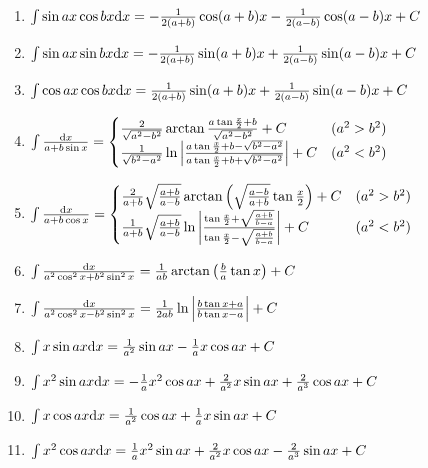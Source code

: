 \begin{enumerate}
	\item $ \int \sin ax \cos bx \mathrm{d} x = -\frac{1}{2(a+b)}\cos(a+b)x - \frac{1}{2(a-b)}\cos(a-b)x + C $

	\item $ \int \sin ax \sin bx \mathrm{d} x = -\frac{1}{2(a+b)}\sin(a+b)x + \frac{1}{2(a-b)}\sin(a-b)x + C $

	\item $ \int \cos ax \cos bx \mathrm{d} x =  \frac{1}{2(a+b)}\sin(a+b)x + \frac{1}{2(a-b)}\sin(a-b)x + C $

	\item $ \int \frac{\mathrm{d} x}{a + b \sin x} = \begin{cases}
	\frac{2}{\sqrt{a^2-b^2}}\arctan\frac{a\tan\frac{x}{2}+b}{\sqrt{a^2-b^2}} + C & (a^2 > b^2) \\
	\frac{1}{\sqrt{b^2-a^2}}\ln \left| \frac{a\tan\frac{x}{2}+b-\sqrt{b^2-a^2}}{a\tan\frac{x}{2}+b+\sqrt{b^2-a^2}} \right| + C & (a^2 < b^2)
	\end{cases} $

	\item $ \int \frac{\mathrm{d} x}{a + b \cos x} = \begin{cases}
	\frac{2}{a+b}\sqrt\frac{a+b}{a-b} \arctan\left(\sqrt\frac{a-b}{a+b}\tan\frac{x}{2}\right) + C & (a^2 > b^2) \\
	\frac{1}{a+b}\sqrt\frac{a+b}{a-b} \ln \left| \frac{\tan\frac{x}{2}+\sqrt\frac{a+b}{b-a}}{\tan\frac{x}{2}-\sqrt\frac{a+b}{b-a}} \right| + C
	& (a^2 < b^2)
	\end{cases} $

	\item $ \int \frac{\mathrm{d} x}{a^2\cos^2x+b^2\sin^2x} = \frac{1}{ab} \arctan\left( \frac{b}{a}\tan x \right) + C $

	\item $ \int \frac{\mathrm{d} x}{a^2\cos^2x-b^2\sin^2x} = \frac{1}{2ab}\ln\left|\frac{b\tan x+a}{b\tan x-a}\right| + C $

	\item $ \int x \sin ax \mathrm{d} x = \frac{1}{a^2} \sin ax - \frac{1}{a} x \cos ax + C $

	\item $ \int x^2 \sin ax \mathrm{d} x = -\frac{1}{a} x^2 \cos ax + \frac{2}{a^2} x \sin ax + \frac{2}{a^3} \cos ax + C$

	\item $ \int x \cos ax \mathrm{d} x = \frac{1}{a^2} \cos ax + \frac{1}{a} x \sin ax + C $

	\item $ \int x^2 \cos ax \mathrm{d} x = \frac{1}{a} x^2 \sin ax + \frac{2}{a^2} x \cos ax - \frac{2}{a^3} \sin ax + C $

	\end{enumerate}

